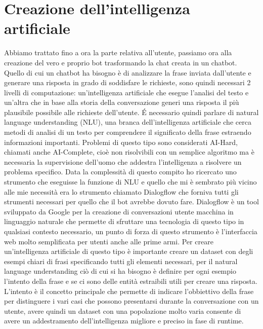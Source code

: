 \section{Creazione dell'intelligenza artificiale}

Abbiamo trattato fino a ora la parte relativa all'utente, passiamo ora alla creazione del vero e proprio bot trasformando la chat creata in un chatbot. Quello di cui un chatbot ha bisogno è di analizzare la frase inviata dall'utente e generare una risposta in grado di soddisfare le richieste, sono quindi necessari 2 livelli di computazione: un'intelligenza artificiale che esegue l'analisi del testo e un'altra che in base alla storia della conversazione generi una risposta il più plausibile possibile alle richieste dell'utente.
\'E necessario quindi parlare di natural language understanding (NLU), una branca dell'intelligenza artificiale che cerca metodi di analisi di un testo per comprendere il significato della frase estraendo informazioni importanti. Problemi di questo tipo sono considerati AI-Hard, chiamati anche AI-Complete, cioè non risolvibili con un semplice algoritmo ma è necessaria la supervisione dell'uomo che addestra l'intelligenza a risolvere un problema specifico.
Data la complessità di questo compito ho ricercato uno strumento che eseguisse la funzione di NLU e quello che mi è sembrato più vicino alle mie necessità era lo strumento chiamato Dialogflow che forniva tutti gli strumenti necessari per quello che il bot avrebbe dovuto fare.
Dialogflow è un tool sviluppato da Google per la creazione di conversazioni utente macchina in linguaggio naturale che permette di sfruttare una tecnologia di questo tipo in qualsiasi contesto necessario, un punto di forza di questo strumento è l'interfaccia web molto semplificata per utenti anche alle prime armi.
Per creare un'intelligenza artificiale di questo tipo è importante creare un dataset con degli esempi chiari di frasi specificando tutti gli elementi necessari, per il natural language understanding ciò di cui si ha bisogno è definire per ogni esempio l'intento della frase e se ci sono delle entità estraibili utili per creare una risposta.
L'intento è il concetto principale che permette di indicare l'obbiettivo della frase per distinguere i vari casi che possono presentarsi durante la conversazione con un utente, avere quindi un dataset con una popolazione molto varia consente di avere un addestramento dell'intelligenza migliore e preciso in fase di runtime.
